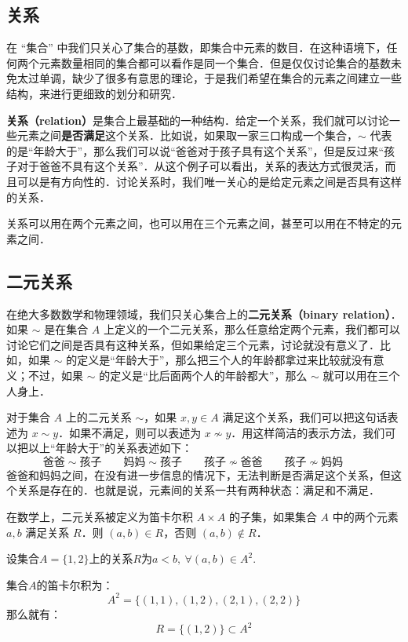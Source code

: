 

\subsection{关系}

在 “集合” 中我们只关心了集合的基数，即集合中元素的数目．在这种语境下，任何两个元素数量相同的集合都可以看作是同一个集合．但是仅仅讨论集合的基数未免太过单调，缺少了很多有意思的理论，于是我们希望在集合的元素之间建立一些结构，来进行更细致的划分和研究．

\textbf{关系（relation）}是集合上最基础的一种结构．给定一个关系，我们就可以讨论一些元素之间\textbf{是否满足}这个关系．比如说，如果取一家三口构成一个集合，$\sim$ 代表的是“年龄大于”，那么我们可以说“爸爸对于孩子具有这个关系”，但是反过来“孩子对于爸爸不具有这个关系”．从这个例子可以看出，关系的表达方式很灵活，而且可以是有方向性的．讨论关系时，我们唯一关心的是给定元素之间是否具有这样的关系．

关系可以用在两个元素之间，也可以用在三个元素之间，甚至可以用在不特定的元素之间．

\subsection{二元关系}

在绝大多数数学和物理领域，我们只关心集合上的\textbf{二元关系（binary relation）}．如果 $\sim$ 是在集合 $A$ 上定义的一个二元关系，那么任意给定两个元素，我们都可以讨论它们之间是否具有这种关系，但如果给定三个元素，讨论就没有意义了．比如，如果 $\sim$ 的定义是“年龄大于”，那么把三个人的年龄都拿过来比较就没有意义；不过，如果 $\sim$ 的定义是“比后面两个人的年龄都大”，那么 $\sim$ 就可以用在三个人身上．

对于集合 $A$ 上的二元关系 $\sim$，如果 $x, y\in A$ 满足这个关系，我们可以把这句话表述为 $x\sim y$．如果不满足，则可以表述为 $x\not\sim y$．用这样简洁的表示方法，我们可以把以上“年龄大于”的关系表述如下：
\begin{equation}
\text{爸爸}\sim\text{孩子} \qquad
\text{妈妈}\sim\text{孩子} \qquad
\text{孩子}\not\sim\text{爸爸} \qquad
\text{孩子}\not\sim\text{妈妈} \qquad
\end{equation}
爸爸和妈妈之间，在没有进一步信息的情况下，无法判断是否满足这个关系，但这个关系是存在的．也就是说，元素间的关系一共有两种状态：满足和不满足．

在数学上，二元关系被定义为笛卡尔积 $A \times A$ 的子集，如果集合 $A$ 中的两个元素 $a,b$ 满足关系 $R$．则 $(a,b) \in R$，否则 $(a,b) \notin R$．
\begin{example}{}
设集合$A=\{1,2\}$上的关系$R$为$a<b,\ \forall (a,b)\in A^2$.

集合$A$的笛卡尔积为：
\begin{equation}
A^2 = \{(1,1),(1,2),(2,1),(2,2)\}
\end{equation}
那么就有：
\begin{equation}
R=\{(1,2)\}\subset A^2
\end{equation}

\end{example}
